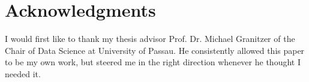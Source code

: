 \chapter*{Acknowledgments}
I would first like to thank my thesis advisor Prof. Dr. Michael Granitzer of the Chair of Data Science at University of Passau. He consistently allowed this paper to be my own work, but steered me in the right direction whenever he thought I needed it.



